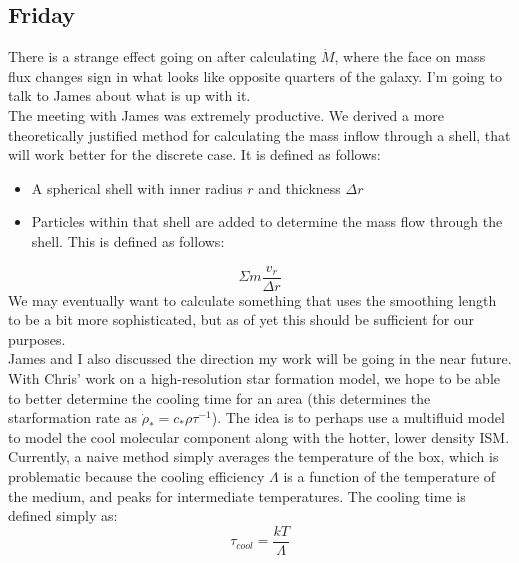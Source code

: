\documentclass[11pt,letterpaper]{article}
\begin{document}
\subsection*{Friday}
There is a strange effect going on after calculating $\dot M$, where the face
on mass flux changes sign in what looks like opposite quarters of the galaxy.
I'm going to talk to James about what is up with it.\\
The meeting with James was extremely productive.  We derived a more 
theoretically justified method for calculating the mass inflow through a shell,
that will work better for the discrete case.  It is defined as follows:
\begin{itemize}
\item A spherical shell with inner radius $r$ and thickness $\Delta r$
\item Particles within that shell are added to determine the mass flow through
the shell.  This is defined as follows:
\end{itemize}
$$\Sigma m \frac{v_r}{\Delta r}$$
We may eventually want to calculate something that uses the smoothing length
to be a bit more sophisticated, but as of yet this should be sufficient for
our purposes.\\
James and I also discussed the direction my work will be going in the near 
future.  With Chris' work on a high-resolution star formation model, we 
hope to be able to better determine the cooling time for an area (this 
determines the starformation rate as $\dot\rho_* = c_*\rho\tau^{-1}$).  The idea
is to perhaps use a multifluid model to model the cool molecular component along
with the hotter, lower density ISM.  Currently, a naive method simply averages
the temperature of the box, which is problematic because the cooling efficiency
$\Lambda$ is a function of the temperature of the medium, and peaks for
intermediate temperatures.  The cooling time is defined simply as:
$$\tau_{cool} = \frac{kT}{\Lambda}$$
\end{document}
